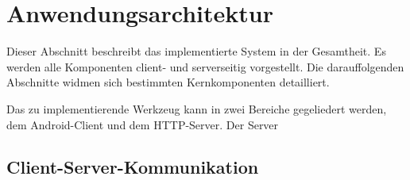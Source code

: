 \section{Anwendungsarchitektur}
\label{app_architecture}
Dieser Abschnitt beschreibt das implementierte System in der Gesamtheit. Es werden alle Komponenten client- und serverseitig vorgestellt. Die darauffolgenden Abschnitte widmen sich bestimmten Kernkomponenten detailliert. 

Das zu implementierende Werkzeug kann in zwei Bereiche gegeliedert werden, dem Android-Client und dem HTTP-Server. Der Server

\subsection{Client-Server-Kommunikation}


